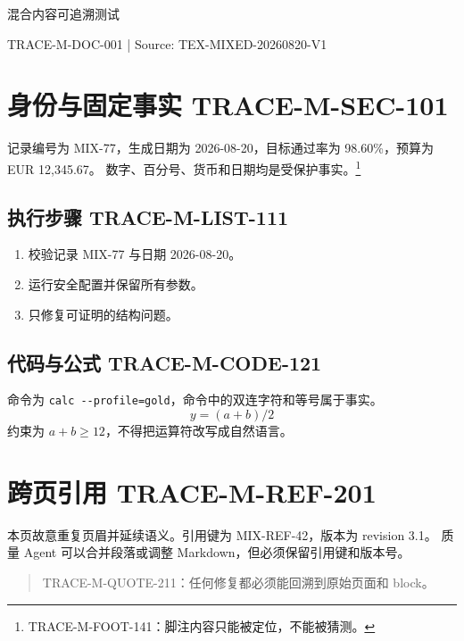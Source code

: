 \documentclass[11pt,a4paper]{ctexart}
\begin{document}
\begin{center}
{\LARGE 混合内容可追溯测试}\par
{\small TRACE-M-DOC-001 | Source: TEX-MIXED-20260820-V1}
\end{center}

\section{身份与固定事实 TRACE-M-SEC-101}
记录编号为 MIX-77，生成日期为 2026-08-20，目标通过率为 98.60\%，预算为 EUR 12,345.67。
数字、百分号、货币和日期均是受保护事实。\footnote{TRACE-M-FOOT-141：脚注内容只能被定位，不能被猜测。}

\subsection{执行步骤 TRACE-M-LIST-111}
\begin{enumerate}
  \item 校验记录 MIX-77 与日期 2026-08-20。
  \item 运行安全配置并保留所有参数。
  \item 只修复可证明的结构问题。
\end{enumerate}

\subsection{代码与公式 TRACE-M-CODE-121}
命令为 \verb|calc --profile=gold|，命令中的双连字符和等号属于事实。
\begin{equation}
  y = (a+b)/2
  \tag{TRACE-M-MATH-131}
\end{equation}
约束为 $a+b\geq 12$，不得把运算符改写成自然语言。

\newpage
\section{跨页引用 TRACE-M-REF-201}
本页故意重复页眉并延续语义。引用键为 MIX-REF-42，版本为 revision 3.1。
质量 Agent 可以合并段落或调整 Markdown，但必须保留引用键和版本号。
\begin{quote}
TRACE-M-QUOTE-211：任何修复都必须能回溯到原始页面和 block。
\end{quote}
\end{document}
